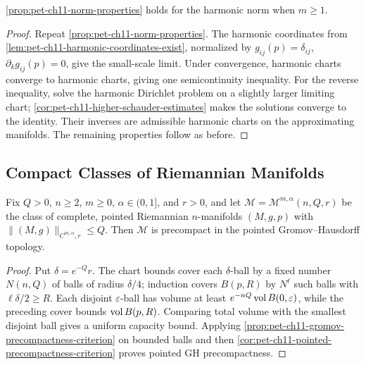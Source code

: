 \begin{proposition}
  \label{prop:pet-ch11-harmonic-norm-properties}

  \cref{prop:pet-ch11-norm-properties} holds for the harmonic norm when
  $m\ge1$.
\end{proposition}
\begin{proof}
  \sketch
  Repeat \cref{prop:pet-ch11-norm-properties}. The harmonic coordinates from
  \cref{lem:pet-ch11-harmonic-coordinates-exist}, normalized by
  \(g_{ij}(p)=\delta_{ij}\), \(\partial_kg_{ij}(p)=0\), give the small-scale
  limit. Under convergence, harmonic charts converge to harmonic charts,
  giving one semicontinuity inequality. For the reverse inequality, solve the
  harmonic Dirichlet problem on a slightly larger limiting chart;
  \cref{cor:pet-ch11-higher-schauder-estimates} makes the solutions converge
  to the identity. Their inverses are admissible harmonic charts on the
  approximating manifolds. The remaining properties follow as before.
\end{proof}


\subsection{Compact Classes of Riemannian Manifolds}

\begin{lemma}
  \label{lem:pet-ch11-fundamental-thm-precompact-gh}

  Fix $Q>0$, $n\ge2$, $m\ge0$, $\alpha\in(0,1]$, and $r>0$, and let
  $\mathcal{M}=\mathcal{M}^{m,\alpha}(n,Q,r)$ be the class of complete,
  pointed Riemannian $n$-manifolds $(M,g,p)$ with
  $\|(M,g)\|_{C^{m,\alpha},r}\le Q$. Then $\mathcal{M}$ is precompact in the
  pointed Gromov--Hausdorff topology.
\end{lemma}
\begin{proof}
  \sketch
  Put \(\delta=e^{-Q}r\). The chart bounds cover each \(\delta\)-ball by a
  fixed number \(N(n,Q)\) of balls of radius \(\delta/4\); induction covers
  \(B(p,R)\) by \(N^\ell\) such balls with \(\ell\delta/2\ge R\). Each
  disjoint \(\varepsilon\)-ball has volume at least
  \(e^{-nQ}\operatorname{vol} B(0,\varepsilon)\), while the preceding cover bounds
  \(\operatorname{vol} B(p,R)\). Comparing total volume with the smallest disjoint ball
  gives a uniform capacity bound. Applying
  \cref{prop:pet-ch11-gromov-precompactness-criterion} on bounded balls and
  then \cref{cor:pet-ch11-pointed-precompactness-criterion} proves pointed GH
  precompactness.
\end{proof}


